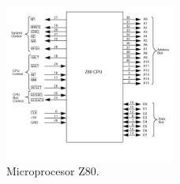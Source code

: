 \documentclass[titlepage,12pt]{article}
\begin{document}
\begin{figure}[H]
    \centering
    \includegraphics[width=0.5\textwidth]{images/z80.jpg}
    \caption{Microprocesor Z80.}
    \label{fig:z80}
\end{figure}
\end{document}
